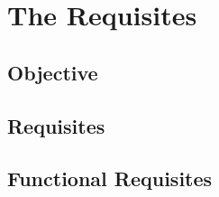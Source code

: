 \chapter{The Requisites} \label{chap:3}


\section{Objective}

\section{Requisites}

\section{Functional Requisites}



